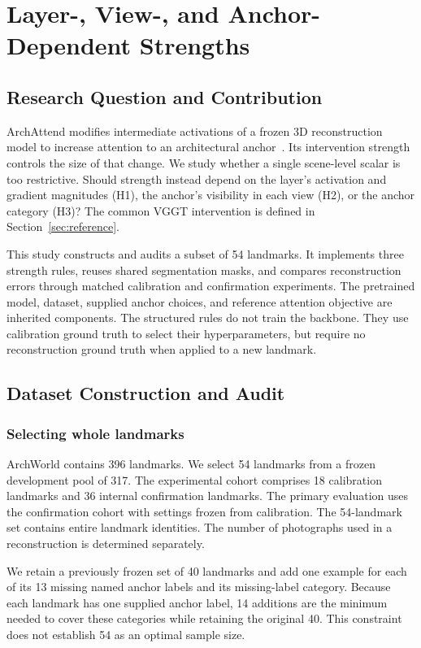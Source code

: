 \section{Layer-, View-, and Anchor-Dependent Strengths}
\label{sec:point3}
\subsection{Research Question and Contribution}
\label{sec:structured-overview}
ArchAttend modifies intermediate activations of a frozen 3D reconstruction model to increase attention to an architectural anchor~\cite{archworld}. Its intervention strength controls the size of that change. We study whether a single scene-level scalar is too restrictive. Should strength instead depend on the layer's activation and gradient magnitudes (H1), the anchor's visibility in each view (H2), or the anchor category (H3)? The common VGGT intervention is defined in Section~\ref{sec:reference}.

This study constructs and audits a subset of 54 landmarks. It implements three strength rules, reuses shared segmentation masks, and compares reconstruction errors through matched calibration and confirmation experiments. The pretrained model, dataset, supplied anchor choices, and reference attention objective are inherited components. The structured rules do not train the backbone. They use calibration ground truth to select their hyperparameters, but require no reconstruction ground truth when applied to a new landmark.

\subsection{Dataset Construction and Audit}
\label{sec:structured-data}
\subsubsection{Selecting whole landmarks}
ArchWorld contains 396 landmarks. We select 54 landmarks from a frozen development pool of 317. The experimental cohort comprises 18 calibration landmarks and 36 internal confirmation landmarks. The primary evaluation uses the confirmation cohort with settings frozen from calibration. The 54-landmark set contains entire landmark identities. The number of photographs used in a reconstruction is determined separately.

We retain a previously frozen set of 40 landmarks and add one example for each of its 13 missing named anchor labels and its missing-label category. Because each landmark has one supplied anchor label, 14 additions are the minimum needed to cover these categories while retaining the original 40. This constraint does not establish 54 as an optimal sample size.

